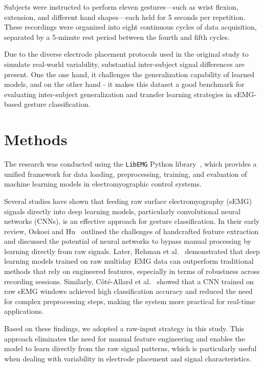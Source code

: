 Subjects were instructed to perform eleven gestures—such as wrist flexion, extension, and different hand shapes—each held for 5 seconds per repetition. These recordings were organized into eight continuous cycles of data acquisition, separated by a 5-minute rest period between the fourth and fifth cycles.

Due to the diverse electrode placement protocols used in the original study to simulate real-world variability, substantial inter-subject signal differences are present. One the one hand, it challenges the generalization capability of learned models, and on the other hand - it makes this dataset a good benchmark for evaluating inter-subject generalization and transfer learning strategies in sEMG-based gesture classification.

\section{Methods}

The research was conducted using the \texttt{LibEMG} Python library~\cite{LibEMG2023}, which provides a unified framework for data loading, preprocessing, training, and evaluation of machine learning models in electromyographic control systems.

Several studies have shown that feeding raw surface electromyography (sEMG) signals directly into deep learning models, particularly convolutional neural networks (CNNs), is an effective approach for gesture classification. In their early review, Oskoei and Hu~\cite{Oskoei2007} outlined the challenges of handcrafted feature extraction and discussed the potential of neural networks to bypass manual processing by learning directly from raw signals. Later, Rehman et al.~\cite{Rehman2018} demonstrated that deep learning models trained on raw multiday EMG data can outperform traditional methods that rely on engineered features, especially in terms of robustness across recording sessions. Similarly, Côté-Allard et al.~\cite{Cote2019} showed that a CNN trained on raw sEMG windows achieved high classification accuracy and reduced the need for complex preprocessing steps, making the system more practical for real-time applications.

Based on these findings, we adopted a raw-input strategy in this study. This approach eliminates the need for manual feature engineering and enables the model to learn directly from the raw signal patterns, which is particularly useful when dealing with variability in electrode placement and signal characteristics.

